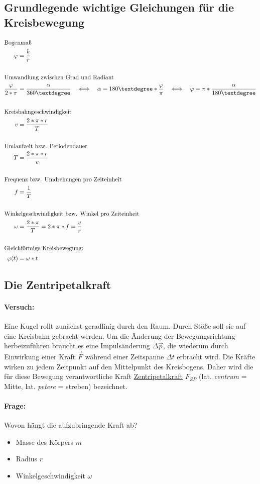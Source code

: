 	\subsection{Grundlegende wichtige Gleichungen für die Kreisbewegung}
	\begin{align}
		\intertext{Bogenmaß}
		\varphi &= \dfrac{b}{r}\\
		\nonumber\\
		\intertext{Umwandlung zwischen Grad und Radiant}
		\dfrac{\varphi}{2*\pi} &= \dfrac{\alpha}{360°} \quad \Longleftrightarrow \quad \alpha = 180°*\dfrac{\varphi}{\pi} \quad \Longleftrightarrow \quad \varphi = \pi*\dfrac{\alpha}{180°}\\
		\nonumber\\
		\intertext{Kreisbahngeschwindigkeit}
		v &= \dfrac{2*\pi*r}{T}\\
		\nonumber\\
		\intertext{Umlaufzeit bzw. Periodendauer}
		T &= \dfrac{2*\pi*r}{v}\\
		\nonumber\\
		\intertext{Frequenz bzw. Umdrehungen pro Zeiteinheit}
		f &= \dfrac{1}{T}\\
		\nonumber\\
		\intertext{Winkelgeschwindigkeit bzw. Winkel pro Zeiteinheit}
		\omega &= \dfrac{2*\pi}{T} = 2*\pi*f = \dfrac{v}{r}\\
		\nonumber\\
		\intertext{Gleichförmige Kreisbewegung:}
		\varphi(t) &= \omega*t
	\end{align}
	
	\subsection{Die Zentripetalkraft}
	\paragraph{Versuch:}
	Eine Kugel rollt zunächst geradlinig durch den Raum. Durch Stöße soll sie auf eine Kreisbahn gebracht werden.
	Um die Änderung der Bewegungsrichtung herbeizuführen braucht es eine Impulsänderung $ \Delta \vec{p} $, die wiederum durch Einwirkung einer Kraft $ \vec{F} $ während einer Zeitspanne $ \Delta t $ erbracht wird. Die Kräfte wirken zu jedem Zeitpunkt auf den Mittelpunkt des Kreisbogens. Daher wird die für diese Bewegung verantwortliche Kraft \underline{Zentripetalkraft} $ F_{ZP} $ (lat. \textit{centrum} = Mitte, lat. \textit{petere} = streben) bezeichnet.
	\paragraph{Frage:}
	Wovon hängt die aufzubringende Kraft ab?
	\begin{itemize}
		\item Masse des Körpers $ m $
		\item Radius $ r $
		\item Winkelgeschwindigkeit $ \omega $
	\end{itemize}
